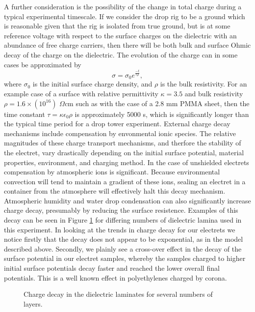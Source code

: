 \documentclass[12pt,a4paper,oneside]{book}
\begin{document}
A further consideration is the possibility of the change in total charge during a typical experimental timescale. If we consider the drop rig to be a ground which is reasonable given that the rig is isolated from true ground, but is at some reference voltage with respect to the surface charges on the dielectric with an abundance of free charge carriers, then there will be both bulk and surface Ohmic decay of the charge on the dielectric. The evolution of the charge can in some cases be approximated by
\[ \sigma = \sigma_0 e^{\frac{-t}{\epsilon \rho}}, \]
where $\sigma_0$ is the initial surface charge density, and $\rho$ is the bulk resistivity. For an example case of a surface with relative permittivity $\kappa = 3.5$ and bulk resistivity $\rho = 1.6 \times (10^{16})$ $\Omega$cm such as with the case of a 2.8 mm PMMA sheet, then the time constant $\tau = \kappa \epsilon_0 \rho$ is approximately 5000 s, which is significantly longer than the typical time period for a drop tower experiment. External charge decay mechanisms include compensation by envonmental ionic species. The relative magnitudes of these charge transport mechanisms, and therfore the stability of the electret, vary drastically depending on the initial surface potential, material properties, environment, and charging method. In the case of unshielded electrets compensation by atmospheric ions is significant\cite{perlman_electrets_1973}. Because environmental convection will tend to  maintain a gradient of these ions, sealing an electret in a container from the atmosphere will effectively halt this decay mechanism. Atmospheric humidity and water drop condensation can also significantly increase charge decay, presumably by reducing the surface resistence\cite{haenen_characteristic_1975}. Examples of this decay can be seen in Figure \ref{fig:charge_decay} for differing numbers of dielectric lamina used in this experiment. In looking at the trends in charge decay for our electrets we notice firstly that the decay does not appear to be exponential, as in the model described above. Secondly, we plainly see a cross-over effect in the decay of the surface potential in our electret samples, whereby the samples charged to higher initial surface potentials decay faster and reached the lower overall final potentials. This is a well known effect in polyethylenes charged by corona\cite{ferreira_corona_1992}.
\begin{figure}[htb!]
    \centering
    {}
       \caption{Charge decay in the dielectric laminates for several numbers of layers.\label{fig:charge_decay}}
\end{figure}
\newpage
\end{document}
